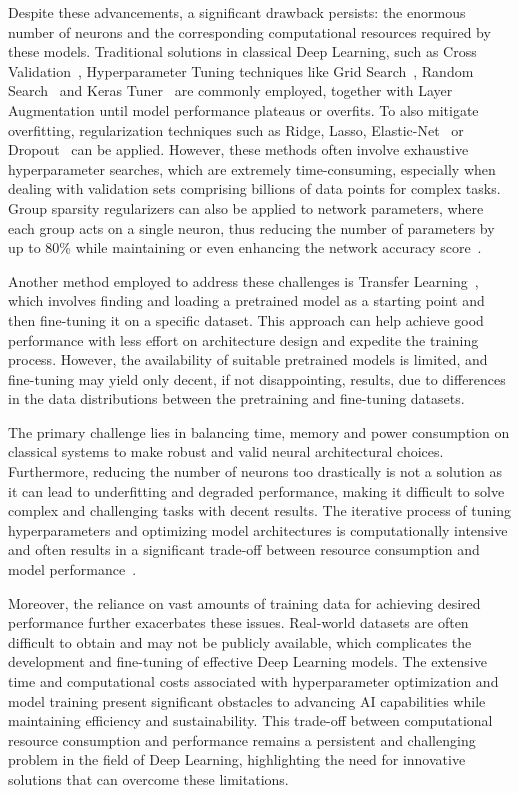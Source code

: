 \documentclass[12pt,a4paper]{report}
\begin{document}
Despite these advancements, a significant drawback persists: the enormous number of neurons and the corresponding computational resources required by these models. Traditional solutions in classical Deep Learning, such as Cross Validation~\cite{berrar2019cross}, Hyperparameter Tuning techniques like Grid Search~\cite{liashchynskyi2019grid}, Random Search~\cite{liashchynskyi2019grid} and Keras Tuner~\cite{pon2021hyperparameter} are commonly employed, together with Layer Augmentation until model performance plateaus or overfits. To also mitigate overfitting, regularization techniques such as Ridge, Lasso, Elastic-Net~\cite{ogutu2012genomic} or Dropout~\cite{srivastava2014dropout} can be applied. However, these methods often involve exhaustive hyperparameter searches, which are extremely time-consuming, especially when dealing with validation sets comprising billions of data points for complex tasks. Group sparsity regularizers can also be applied to network parameters, where each group acts on a single neuron, thus reducing the number of parameters by up to 80\% while maintaining or even enhancing the network accuracy score~\cite{alvarez2018learning}.

Another method employed to address these challenges is Transfer Learning~\cite{weiss2016survey}, which involves finding and loading a pretrained model as a starting point and then fine-tuning it on a specific dataset. This approach can help achieve good performance with less effort on architecture design and expedite the training process. However, the availability of suitable pretrained models is limited, and fine-tuning may yield only decent, if not disappointing, results, due to differences in the data distributions between the pretraining and fine-tuning datasets.

The primary challenge lies in balancing time, memory and power consumption on classical systems to make robust and valid neural architectural choices. Furthermore, reducing the number of neurons too drastically is not a solution as it can lead to underfitting and degraded performance, making it difficult to solve complex and challenging tasks with decent results. The iterative process of tuning hyperparameters and optimizing model architectures is computationally intensive and often results in a significant trade-off between resource consumption and model performance~\cite{liashchynskyi2019grid}.

Moreover, the reliance on vast amounts of training data for achieving desired performance further exacerbates these issues. Real-world datasets are often difficult to obtain and may not be publicly available, which complicates the development and fine-tuning of effective Deep Learning models. The extensive time and computational costs associated with hyperparameter optimization and model training present significant obstacles to advancing AI capabilities while maintaining efficiency and sustainability. This trade-off between computational resource consumption and performance remains a persistent and challenging problem in the field of Deep Learning, highlighting the need for innovative solutions that can overcome these limitations.
\end{document}
